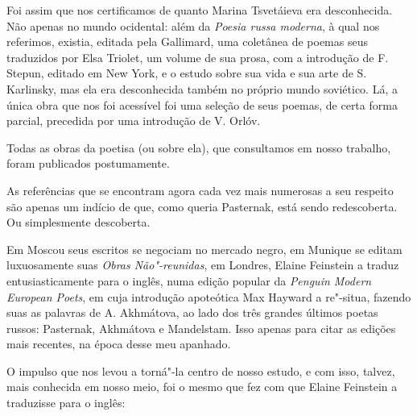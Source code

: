 Foi assim que nos certificamos de quanto Marina Tsvetáieva era
desconhecida. Não apenas no mundo ocidental: além da \emph{Poesia russa
moderna}, à qual nos referimos, existia, editada pela Gallimard, uma
coletânea de poemas seus traduzidos por Elsa Triolet, um volume
de sua prosa, com a introdução de F. Stepun, editado em New
York, e o estudo sobre sua vida e sua arte de S.
Karlinsky, mas ela era desconhecida também no próprio mundo
soviético. Lá, a única obra que nos foi acessível foi uma seleção de
seus poemas, de certa forma parcial, precedida por uma introdução de V.
Orlóv.

Todas as obras da poetisa (ou sobre ela), que consultamos em nosso
trabalho, foram publicados postumamente.

As referências que se encontram agora cada vez mais numerosas a seu
respeito
são apenas um indício de que, como queria Pasternak, está sendo
redescoberta. Ou simplesmente descoberta.

Em Moscou seus escritos se negociam no mercado negro, em Munique se
editam luxuosamente suas \emph{Obras Não"-reunidas}, em Londres, Elaine Feinstein a traduz
entusiasticamente para o inglês, numa edição popular da \emph{Penguin
Modern European Poets}, em cuja introdução apoteótica Max Hayward a re"-situa, fazendo
suas as palavras de A. Akhmátova, ao lado dos três grandes últimos
poetas russos: Pasternak, Akhmátova e Mandelstam. Isso apenas para citar
as edições mais recentes, na época desse meu apanhado.

O impulso que nos levou a torná"-la centro de nosso estudo, e com isso,
talvez, mais conhecida em nosso meio, foi o mesmo que fez com que Elaine
Feinstein a traduzisse para o inglês:


